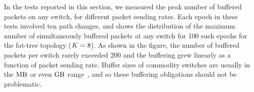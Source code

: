 In the tests reported in this section, we measured the peak number of
buffered packets on any switch, for different packet sending
rates. Each epoch in these tests involved ten path changes,
and  shows the distribution of the maximum number
of simultaneously buffered packets at any switch for 100 such epochs
for the fat-tree topology ($K = 8$).  As shown in the
figure, the number of buffered packets per switch rarely exceeded 200
and the buffering grew linearly as a function of packet sending rate.
Buffer sizes of commodity switches are usually in the $\textrm{MB}$ or
even $\textrm{GB}$ range~\cite{buffer},
and so these buffering obligations should not be problematic.
